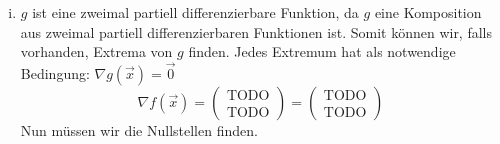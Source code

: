 \documentclass[10pt,a4paper,parskip=half]{scrartcl}
\begin{document}
\begin{enumerate}[(i)]
	\item	
\(g\) ist eine zweimal partiell differenzierbare Funktion, da \(g\) eine Komposition aus zweimal partiell differenzierbaren Funktionen ist. Somit können wir, falls vorhanden, Extrema von $g$ finden. Jedes Extremum hat als notwendige Bedingung: $\nabla g(\vec x) = \vec 0$
	\[ \nabla f (\vec x) = 
	\begin{pmatrix}
		\text{TODO} \\
		\text{TODO} 
	\end{pmatrix} =  
	\begin{pmatrix}
		\text{TODO} \\
		\text{TODO} 
	\end{pmatrix}  \]
Nun müssen wir die Nullstellen finden.

	\end{enumerate}
\end{document}
